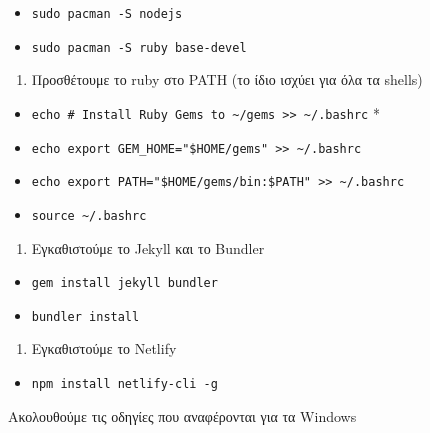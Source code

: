 \begin{itemize}
\tightlist
\item
  \texttt{sudo\ pacman\ -S\ nodejs}
\item
  \texttt{sudo\ pacman\ -S\ ruby\ base-devel}
\end{itemize}

\begin{enumerate}
\def\labelenumi{\arabic{enumi}.}
\setcounter{enumi}{1}
\tightlist
\item
  Προσθέτουμε το ruby στο PATH (το ίδιο ισχύει για όλα τα shells)
\end{enumerate}

\begin{itemize}
\tightlist
\item
  \texttt{echo\ \textquotesingle{}\#\ Install\ Ruby\ Gems\ to\ \textasciitilde{}/gems\textquotesingle{}\ \textgreater{}\textgreater{}\ \textasciitilde{}/.bashrc}
  *
\item
  \texttt{echo\ \textquotesingle{}export\ GEM\_HOME="\$HOME/gems"\textquotesingle{}\ \textgreater{}\textgreater{}\ \textasciitilde{}/.bashrc}
\item
  \texttt{echo\ \textquotesingle{}export\ PATH="\$HOME/gems/bin:\$PATH"\textquotesingle{}\ \textgreater{}\textgreater{}\ \textasciitilde{}/.bashrc}
\item
  \texttt{source\ \textasciitilde{}/.bashrc}
\end{itemize}

\begin{enumerate}
\def\labelenumi{\arabic{enumi}.}
\setcounter{enumi}{2}
\tightlist
\item
  Εγκαθιστούμε το Jekyll και το Bundler
\end{enumerate}

\begin{itemize}
\tightlist
\item
  \texttt{gem\ install\ jekyll\ bundler}
\item
  \texttt{bundler\ install}
\end{itemize}

\begin{enumerate}
\def\labelenumi{\arabic{enumi}.}
\setcounter{enumi}{3}
\tightlist
\item
  Εγκαθιστούμε το Netlify
\end{enumerate}

\begin{itemize}
\tightlist
\item
  \texttt{npm\ install\ netlify-cli\ -g}
\end{itemize}

Ακολουθούμε τις οδηγίες που αναφέρονται για τα Windows
